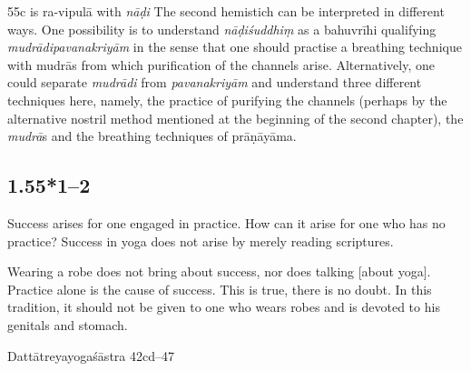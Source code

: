 \begin{ekdosis}
\begin{testimonia}[hp01_055]
\end{testimonia}

\begin{philcomm}[hp01_055]
55c is ra-vipulā with \emph{nāḍi}
The second hemistich can be interpreted in different ways. One possibility is to understand \emph{nāḍiśuddhiṃ} as a bahuvrīhi qualifying \emph{mudrādipavanakriyām} in the sense that one should practise a breathing technique with mudrās from which purification of the channels arise. Alternatively, one could separate \emph{mudrādi} from \emph{pavanakriyām} and understand three different techniques here, namely, the practice of purifying the channels (perhaps by the alternative nostril method mentioned at the beginning of the second chapter), the \emph{mudrā}s and the breathing techniques of prāṇāyāma.  
\end{philcomm}

\subsection*{1.55*1--2}
\begin{translation}[hp01_055_1]
Success arises for one engaged in practice. How can it arise for one who has no practice? Success in yoga does not arise by merely reading scriptures.

Wearing a robe does not bring about success, nor does talking [about yoga]. Practice alone is the cause of success. This is true, there is no doubt. In this tradition, it should not be given to one who wears robes and is devoted to his genitals and stomach.
\end{translation}

\begin{sources}[hp01_055_1]
Dattātreyayogaśāstra 42cd--47

\begin{versinnote}
\end{versinnote}

\end{sources}


\end{ekdosis}
